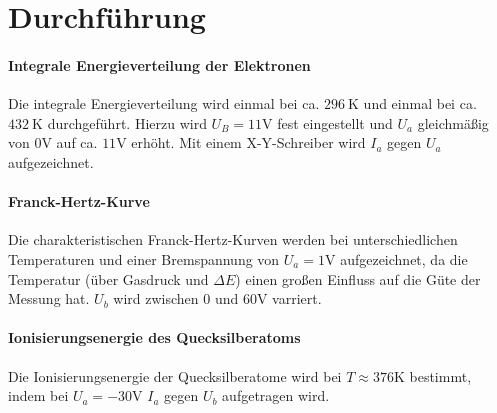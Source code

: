 \section{Durchführung}
\label{sec:Durchführung}

\paragraph{Integrale Energieverteilung der Elektronen}
Die integrale Energieverteilung wird einmal bei ca. $\SI{296}{\kelvin}$ und einmal bei ca. $\SI{432}{\kelvin}$ durchgeführt. Hierzu wird $U_B = 11 \si{\volt}$ fest eingestellt und $U_a$ gleichmäßig von $0\si{\volt}$ auf ca. $11\si{\volt}$ erhöht. Mit einem X-Y-Schreiber wird $I_a$ gegen $U_a$ aufgezeichnet.

\paragraph{Franck-Hertz-Kurve}
Die charakteristischen Franck-Hertz-Kurven werden bei unterschiedlichen Temperaturen und einer Bremspannung von $U_a = 1\si{\volt}$ aufgezeichnet, da die Temperatur (über Gasdruck und $\Delta E$) einen großen Einfluss auf die Güte der Messung hat. $U_b$ wird zwischen $0$ und $60 \si{\volt}$ varriert.

\paragraph{Ionisierungsenergie des Quecksilberatoms}
Die Ionisierungsenergie der Quecksilberatome wird bei $T \approx 376 \si{\kelvin}$ bestimmt, indem bei $U_a = -30 \si{\volt}$ $I_a$ gegen $U_b$ aufgetragen wird.
